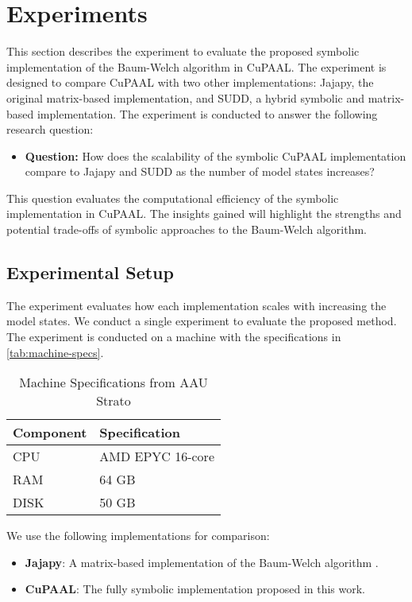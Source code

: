\section{Experiments}\label{sec:experiments}
This section describes the experiment to evaluate the proposed symbolic implementation of the Baum-Welch algorithm in CuPAAL.
The experiment is designed to compare CuPAAL with two other implementations: Jajapy, the original matrix-based implementation, and SUDD, a hybrid symbolic and matrix-based implementation.
The experiment is conducted to answer the following research question:

\begin{itemize}
\item \textbf{Question:} How does the scalability of the symbolic CuPAAL implementation compare to Jajapy and SUDD as the number of model states increases?
\end{itemize}

This question evaluates the computational efficiency of the symbolic implementation in CuPAAL. The insights gained will highlight the strengths and potential trade-offs of symbolic approaches to the Baum-Welch algorithm.

\subsection{Experimental Setup}
The experiment evaluates how each implementation scales with increasing the model states. We conduct a single experiment to evaluate the proposed method.
The experiment is conducted on a machine with the specifications in \autoref{tab:machine-specs}. 
\begin{table}
\centering
\caption{Machine Specifications from AAU Strato}
\label{tab:machine-specs}
    \begin{tabular}{ll}
        \toprule
        \textbf{Component} & \textbf{Specification} \\
        \midrule
        CPU & AMD EPYC 16-core \\
        RAM & 64 GB \\
        DISK & 50 GB \\
        \bottomrule
    \end{tabular}
\end{table}

We use the following implementations for comparison:

\begin{itemize}
\item \textbf{Jajapy}: A matrix-based implementation of the Baum-Welch algorithm \cite{reynouard2023jajapy}.
\item \textbf{CuPAAL}: The fully symbolic implementation proposed in this work.
\end{itemize}

